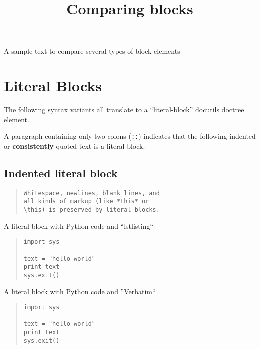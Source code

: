 \documentclass[10pt,a4paper,english]{article}
\title{Comparing blocks}
\author{}
\date{}
\newlength{\locallinewidth}
\begin{document}
\maketitle


\setlength{\locallinewidth}{\linewidth}
% 

A sample text to compare several types of block elements



\hypertarget{literal-blocks}{}
\section*{Literal Blocks}

The following syntax variants all translate to a ``literal-block'' docutils
doctree element.

A paragraph containing only two colons (\texttt{::}) indicates that the following
indented or \textbf{consistently} quoted text is a literal block.



\hypertarget{indented-literal-block}{}
\subsection*{Indented literal block}
\begin{quote}\begin{Verbatim}
Whitespace, newlines, blank lines, and
all kinds of markup (like *this* or
\this) is preserved by literal blocks.
\end{Verbatim}
\end{quote}


A literal block with Python code and ``lstlisting``

\begin{quote}
\begin{lstlisting}
import sys

text = "hello world"
print text
sys.exit()
\end{lstlisting}
\end{quote}

A literal block with Python code and ''Verbatim``

\begin{quote}
\begin{Verbatim}
import sys

text = "hello world"
print text
sys.exit()
\end{Verbatim}
\end{quote}
\end{document}
